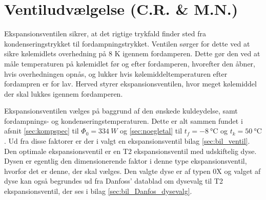 \documentclass[../Hovedrapport.tex]{subfiles}
\begin{document}
\section{Ventiludvælgelse (C.R. \& M.N.)}
    \label{sec:dim_ventil}
Ekspansionsventilen sikrer, at det rigtige trykfald finder sted fra kondenseringstrykket til fordampningstrykket. Ventilen sørger for dette ved at sikre kølemidlets overhedning på 8 K igennem fordamperen. Dette gør den ved at måle temperaturen på kølemidlet før og efter fordamperen, hvorefter den åbner, hvis overhedningen opnås, og lukker hvis kølemiddeltemperaturen efter fordampren er for lav. Herved styrer ekspansionsventilen, hvor meget kølemiddel der skal lukkes igennem fordamperen.

Ekspansionsventilen vælges på baggrund af den ønskede kuldeydelse, samt fordampnings- og kondenseringstemperaturen. Dette er alt sammen fundet i afsnit \ref{sec:kompspec} til $\Phi_0 = \SI{334}{W}$ og \ref{sec:noegletal} til $t_{f} = \SI{-8}{\celsius}$ og $t_{k} = \SI{50}{\celsius}$.
Ud fra disse faktorer er der i \citep{Coolselector} valgt en ekspansionsventil bilag \ref{sec:bil_ventil}. Den optimale ekspansionsventil er en T2 ekspansionsventil med udskiftelig dyse. Dysen er egentlig den dimensionerende faktor i denne type ekspansionsventil, hvorfor det er denne, der skal vælges. Den valgte dyse er af typen 0X og valget af dyse kan også begrundes ud fra Danfoss' datablad om dysevalg til T2 ekspansionsventil, der ses i bilag \ref{sec:bil_Danfos_dysevalg}.
\end{document}

